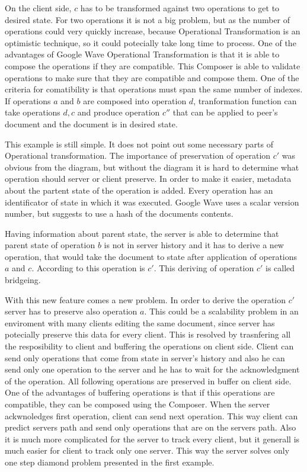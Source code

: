 \documentclass[12pt,oneside]{fithesis2}
\begin{document}
\par On the client side, \(c\) has to be transformed against two operations to get to desired state. For two operations it is not a big problem, but as the number of operations could very quickly increase, because Operational Transformation is an optimistic technique, so it could potecially take long time to process. One of the advantages of Google Wave Operational Transformation is that it is able to compose the operations if they are compatible. This Composer is able to validate operations to make sure that they are compatible and compose them. One of the criteria for comatibility is that operations must span the same number of indexes.  If operations \(a\) and \(b\) are composed into operation \(d\), tranformation function can take operations \(d,c\) and produce operation \(c''\) that can be applied to peer's document and the document is in desired state. 
\par This example is still simple. It does not point out some necessary parts of Operational transformation. The importance of preservation of operation \(c'\) was obvious from the diagram, but without the diagram it is hard to determine what operation should server or client preserve. In order to make it easier, metadata about the partent state of the operation is added. Every operation has an identificator of state in which it was executed. Google Wave uses a scalar version number, but \cite{Spiewak} suggests to use a hash of the documents contents. 
\par Having information about parent state, the server is able to determine that parent state of operation \(b\) is not in server history and it has to derive a new operation, that would take the document to state after application of operations \(a\) and \(c\). According to \cite{Spiewak} this operation is \(c'\). This deriving of operation \(c'\) is called bridgeing.
\par With this new feature comes a new problem. In order to derive the operation \(c'\) server has to preserve also operation \(a\). This could be a scalability problem in an enviroment with many clients editing the same document, since server has potecially preserve this data for every client. This is resolved by trasnfering all the resposibility to client and buffering the operations on client side. Client can send only operations that come from state in server's history and also he can send only one operation to the server and he has to wait for the acknowledgment of the operation. All following operations are preserved in buffer on client side. One of the advantages of buffering operations is that if this operations are compatible, they can be composed using the Composer. When the server ackwnoledges first operation, client can send next operation. This way client can predict servers path and send only operations that are on the servers path. Also it is much more complicated for the server to track every client, but it generall is much easier for client to track only one server. This way the server solves only one step diamond problem presented in the first example.
\end{document}
